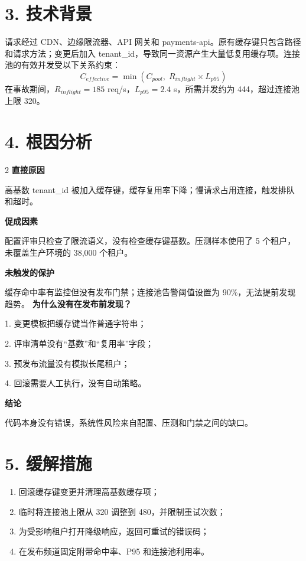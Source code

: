 \documentclass[10pt,a4paper]{article}
\begin{document}
\section*{3. 技术背景}
请求经过 CDN、边缘限流器、API 网关和 payments-api。原有缓存键只包含路径和请求方法；变更后加入 tenant\_id，导致同一资源产生大量低复用缓存项。连接池的有效并发受以下关系约束：
\[
C_{effective}=\min(C_{pool},\; R_{inflight}\times L_{p95})
\]
在事故期间，$R_{inflight}=185$ req/s，$L_{p95}=2.4$ s，所需并发约为 444，超过连接池上限 320。
\section*{4. 根因分析}
\begin{multicols}{2}
{\bfseries 直接原因}\par
高基数 tenant\_id 被加入缓存键，缓存复用率下降；慢请求占用连接，触发排队和超时。
\par\vspace{5mm}
{\bfseries 促成因素}\par
配置评审只检查了限流语义，没有检查缓存键基数。压测样本使用了 5 个租户，未覆盖生产环境的 38,000 个租户。
\par\vspace{5mm}
{\bfseries 未触发的保护}\par
缓存命中率有监控但没有发布门禁；连接池告警阈值设置为 90\%，无法提前发现趋势。
\columnbreak
{\bfseries 为什么没有在发布前发现？}\par
1. 变更模板把缓存键当作普通字符串；\par
2. 评审清单没有“基数”和“复用率”字段；\par
3. 预发布流量没有模拟长尾租户；\par
4. 回滚需要人工执行，没有自动策略。
\par\vspace{6mm}
{\bfseries 结论}\par
代码本身没有错误，系统性风险来自配置、压测和门禁之间的缺口。
\end{multicols}
\section*{5. 缓解措施}
\begin{enumerate}
\item 回滚缓存键变更并清理高基数缓存项；
\item 临时将连接池上限从 320 调整到 480，并限制重试次数；
\item 为受影响租户打开降级响应，返回可重试的错误码；
\item 在发布频道固定附带命中率、P95 和连接池利用率。
\end{enumerate}
\newpage
\end{document}
